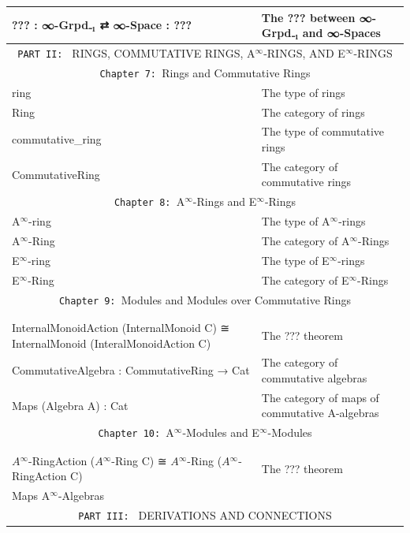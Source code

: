 \documentclass{book}
\theoremstyle{definition}
\begin{document}
{\begin{longtable}{|| l || l ||}
\hline
??? : ∞-Grpd₋₁ ⇄ ∞-Space : ??? & The ??? between ∞-Grpd₋₁ and ∞-Spaces \\
\hline \hline
\multicolumn{2}{||c||}{\texttt{PART II: } RINGS, COMMUTATIVE RINGS, A${}^{\infty}$-RINGS, AND E${}^{\infty}$-RINGS} \\
\hline \hline
\multicolumn{2}{||c||}{\texttt{Chapter 7: }Rings and Commutative Rings} \\
\hline \hline
ring & The type of rings \\
 \hline
Ring & The category of rings \\
\hline
commutative\_ring & The type of commutative rings  \\
\hline
CommutativeRing & The category of commutative rings \\
 \hline \hline
  \multicolumn{2}{||c||}{\texttt{Chapter 8: }A${}^{\infty}$-Rings and E${}^{\infty}$-Rings} \\
\hline \hline
A${}^{\infty}$-ring & The type of A${}^{\infty}$-rings \\
\hline
A${}^{\infty}$-Ring & The category of A${}^{\infty}$-Rings \\
 \hline
E${}^{\infty}$-ring  & The type of E${}^{\infty}$-rings \\
 \hline
E${}^{\infty}$-Ring  & The category of E${}^{\infty}$-Rings \\
 \hline \hline
\multicolumn{2}{||c||}{\texttt{Chapter 9: }Modules and Modules over Commutative Rings} \\
\hline \hline
 &  \\
 \hline
 &  \\
 \hline
InternalMonoidAction (InternalMonoid C) ≅ InternalMonoid (InteralMonoidAction C) & The ??? theorem \\ 
\hline
CommutativeAlgebra : CommutativeRing → Cat & The category of commutative algebras \\
\hline
Maps (Algebra A) : Cat & The category of maps of commutative A-algebras \\
\hline \hline
\multicolumn{2}{||c||}{\texttt{Chapter 10: }A${}^{\infty}$-Modules and E${}^{\infty}$-Modules} \\
\hline \hline
 &  \\
\hline
 &  \\
\hline
$A{}^{\infty}$-RingAction ($A{}^{\infty}$-Ring C) ≅ $A{}^{\infty}$-Ring ($A{}^{\infty}$-RingAction C) & The ??? theorem \\ 
\hline
Maps A${}^{\infty}$-Algebras & \\
 \hline \hline
\multicolumn{2}{||c||}{\texttt{PART III: } DERIVATIONS AND CONNECTIONS} \\

\end{longtable}}
\end{document}
